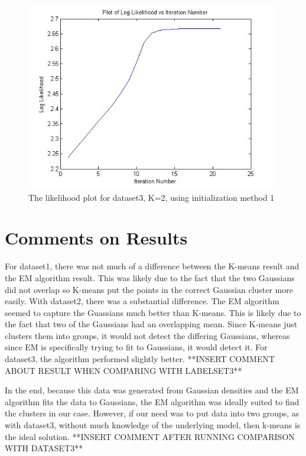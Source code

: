 \documentclass[11pt,psfig]{article}
\begin{document}
\begin{figure}[H]
\centering
\includegraphics[height=3.25in]{dataset3_EMlogLikelihoodPlot.jpg}
\caption{The likelihood plot for dataset3, K=2, using initialization method 1}
\end{figure}

\section*{Comments on Results}

For dataset1, there was not much of a difference between the K-means result and the EM algorithm result. This was likely due to the fact that the two Gaussians did not overlap so K-means put the points in the correct Gaussian cluster more easily. With dataset2, there was a substantial difference. The EM algorithm seemed to capture the Guassians much better than K-means. This is likely due to the fact that two of the Gaussians had an overlapping mean. Since K-means just clusters them into groups, it would not detect the differing Gaussians, whereas since EM is specifically trying to fit to Gaussians, it would detect it. For dataset3, the algorithm performed slightly better. **INSERT COMMENT ABOUT RESULT WHEN COMPARING WITH LABELSET3**

In the end, because this data was generated from Gaussian densities and the EM algorithm fits the data to Gaussians, the EM algorithm was ideally suited to find the clusters in our case. However, if our need was to put data into two groups, as with dataset3, without much knowledge of the underlying model, then k-means is the ideal solution. **INSERT COMMENT AFTER RUNNING COMPARISON WITH DATASET3**
\end{document}
